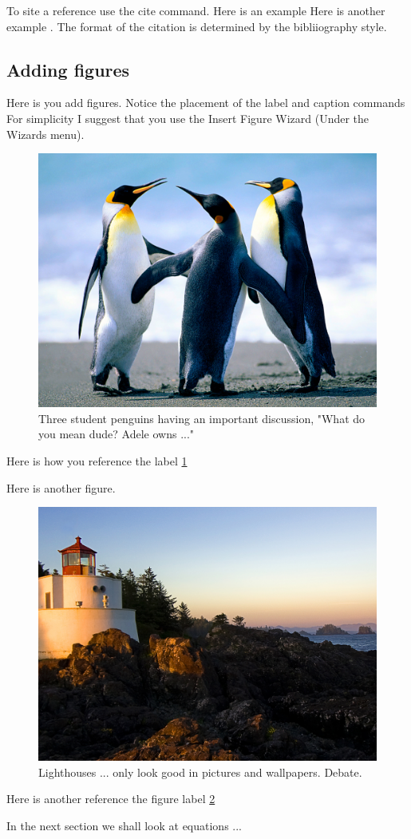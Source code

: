 To site a reference use the cite command. Here is an example \cite{Rie71}
Here is another example \cite{Ful83}.
The format of the citation is determined by the bibliiography style.


\label{MySubSection 1}
\subsection{Adding figures}

Here is you add figures. Notice the placement of the label and caption commands For simplicity I suggest that you use the Insert Figure Wizard (Under the Wizards menu).

\begin{figure} [hbtp]
\begin{center}
\includegraphics[width=12cm]{./images/Penguins}
\end{center}
\caption{Three student penguins having an important discussion, "What do you mean dude? Adele owns ..."}
\label{figPenguins}
\end{figure}

Here is how you reference the label \ref{figPenguins}


Here is another figure.

\begin{figure}[hbtp]
\centering
\includegraphics[width=12cm]{./images/Lighthouse}
\caption{Lighthouses ... only look good in pictures and wallpapers. Debate.}
\label{figLighthouse}
\end{figure}

Here is another reference the figure label \ref{figLighthouse}

In the next section we shall look at equations ...
